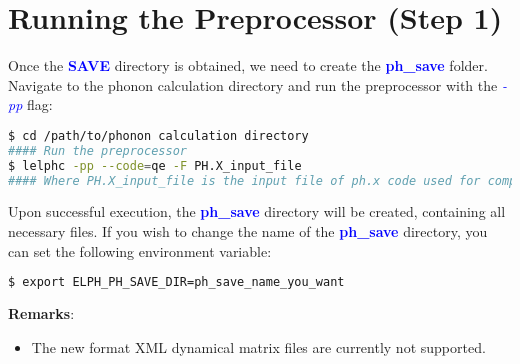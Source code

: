 \documentclass[12pt,twoside,openany]{book}
\begin{document}
\section{Running the Preprocessor (Step 1)}
Once the \textcolor{blue}{\bf{SAVE}} directory is obtained, we need to create the \textcolor{blue}{\bf{ph\_save}} folder. Navigate to the phonon calculation directory and run the preprocessor with the \textcolor{blue}{\emph{-pp}} flag:
\begin{lstlisting}[language=bash]
$ cd /path/to/phonon calculation directory
#### Run the preprocessor
$ lelphc -pp --code=qe -F PH.X_input_file
#### Where PH.X_input_file is the input file of ph.x code used for computing phonons
\end{lstlisting}
Upon successful execution, the \textcolor{blue}{\bf{ph\_save}} directory will be created, containing all necessary files.
If you wish to change the name of the \textcolor{blue}{\bf{ph\_save}} directory, you can set the following environment variable:
\begin{lstlisting}[language=bash]
$ export ELPH_PH_SAVE_DIR=ph_save_name_you_want
\end{lstlisting}
\textbf{Remarks}:
\begin{itemize}
\item The new format XML dynamical matrix files are currently not supported.
\end{itemize}
\end{document}
